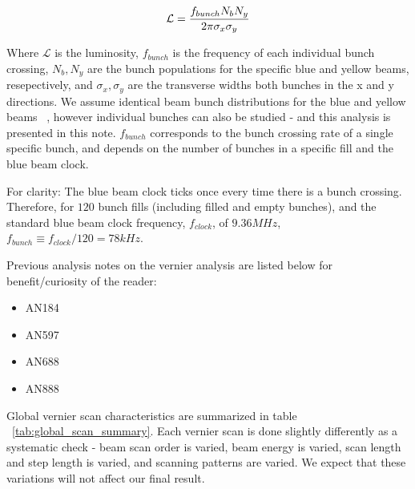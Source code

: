 \begin{equation} 
\label{eq:lumi_one_bunch} 
\mathcal{L} = {f_{bunch}N_{b} N_{y}\over{2\pi\sigma_{x}\sigma_{y}}} 
\end{equation}

Where $\mathcal{L}$ is the luminosity, $f_{bunch}$ is the frequency of each
individual bunch crossing, $N_{b}, N_{y}$ are the bunch populations for the
specific blue and yellow beams, resepectively, and $\sigma_{x}, \sigma_{y}$ are
the transverse widths both bunches in the x and y directions. We assume
identical beam bunch distributions for the blue and yellow beams
~\cite{AN888Datta2010}, however individual bunches can also be studied - and
this analysis is presented in this note. $f_{bunch}$ corresponds to the bunch
crossing rate of a single specific bunch, and depends on the number of bunches
in a specific fill and the blue beam clock.

For clarity: The blue beam clock ticks once every time there is a bunch
crossing.  Therefore, for $120$ bunch fills (including filled and empty
bunches), and the standard blue beam clock frequency, $f_{clock}$, of $9.36
MHz$, $f_{bunch} \equiv f_{clock} / 120 = 78 kHz$.

Previous analysis notes on the vernier analysis are listed below for
benefit/curiosity of the reader:

\begin{itemize}
\item AN184~\cite{AN184Belikov2003}
\item AN597~\cite{an597Bazilevsky2007}
\item AN688~\cite{an688Bennet2008}
\item AN888~\cite{AN888Datta2010}
\end{itemize}

Global vernier scan characteristics are summarized in table
~\ref{tab:global_scan_summary}. Each vernier scan is done slightly differently
as a systematic check - beam scan order is varied, beam energy is varied, scan
length and step length is varied, and scanning patterns are varied. We expect
that these variations will not affect our final result.

